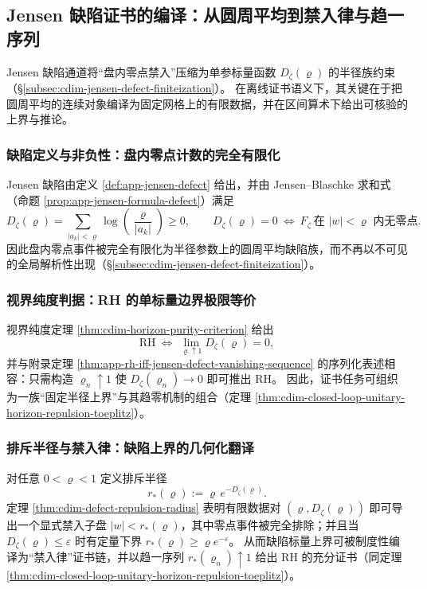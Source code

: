 \subsection{Jensen 缺陷证书的编译：从圆周平均到禁入律与趋一序列}\label{subsec:cdim-jensen-defect-certificate-compilation}
Jensen 缺陷通道将“盘内零点禁入”压缩为单参标量函数 \(D_{\zeta}(\varrho)\) 的半径族约束（\S\ref{subsec:cdim-jensen-defect-finiteization}）。
在离线证书语义下，其关键在于把圆周平均的连续对象编译为固定网格上的有限数据，并在区间算术下给出可核验的上界与推论。

\subsubsection{缺陷定义与非负性：盘内零点计数的完全有限化}
Jensen 缺陷由定义 \ref{def:app-jensen-defect} 给出，并由 Jensen--Blaschke 求和式（命题 \ref{prop:app-jensen-formula-defect}）满足
\[
D_{\zeta}(\varrho)=\sum_{|a_k|<\varrho}\log\!\left(\frac{\varrho}{|a_k|}\right)\ge 0,
\qquad
D_{\zeta}(\varrho)=0\ \Longleftrightarrow\ F_{\zeta}\ \text{在 }|w|<\varrho\text{ 内无零点}.
\]
因此盘内零点事件被完全有限化为半径参数上的圆周平均缺陷族，而不再以不可见的全局解析性出现（\S\ref{subsec:cdim-jensen-defect-finiteization}）。

\subsubsection{视界纯度判据：RH 的单标量边界极限等价}
视界纯度定理 \ref{thm:cdim-horizon-purity-criterion} 给出
\[
\mathrm{RH}\ \Longleftrightarrow\ \lim_{\varrho\uparrow 1}D_{\zeta}(\varrho)=0,
\]
并与附录定理 \ref{thm:app-rh-iff-jensen-defect-vanishing-sequence} 的序列化表述相容：只需构造 \(\varrho_n\uparrow 1\) 使 \(D_{\zeta}(\varrho_n)\to 0\) 即可推出 RH。
因此，证书任务可组织为一族“固定半径上界”与其趋零机制的组合（定理 \ref{thm:cdim-closed-loop-unitary-horizon-repulsion-toeplitz}）。

\subsubsection{排斥半径与禁入律：缺陷上界的几何化翻译}
对任意 \(0<\varrho<1\) 定义排斥半径
\[
r_{\ast}(\varrho):=\varrho\,e^{-D_{\zeta}(\varrho)}.
\]
定理 \ref{thm:cdim-defect-repulsion-radius} 表明有限数据对 \((\varrho,D_{\zeta}(\varrho))\) 即可导出一个显式禁入子盘 \(|w|<r_{\ast}(\varrho)\)，其中零点事件被完全排除；并且当 \(D_{\zeta}(\varrho)\le\varepsilon\) 时有定量下界 \(r_{\ast}(\varrho)\ge \varrho e^{-\varepsilon}\)。
从而缺陷标量上界可被制度性编译为“禁入律”证书链，并以趋一序列 \(r_{\ast}(\varrho_n)\uparrow 1\) 给出 RH 的充分证书（同定理 \ref{thm:cdim-closed-loop-unitary-horizon-repulsion-toeplitz}）。

